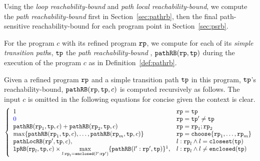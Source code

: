 Using the \emph{loop reachability-bound} and \emph{path local reachability-bound}, we compute the \emph{path reachability-bound} first in Section~\ref{sec:pathrb}, 
then the final path-sensitive reachability-bound for each program point in Section~\ref{sec:psrb}.

For the program $c$ with its refined program $\mathtt{rp}$, we compute
for each of its \emph{simple transition path}s, $\mathtt{tp}$ the \emph{path reachability-bound} , $\mathtt{pathRB}(\mathtt{rp}, \mathtt{tp})$ during the execution of the program $c$ as in Definition~\ref{def:pathrb}.
%
\begin{defn}
  \label{def:pathrb}
  Given a refined program $\mathtt{rp}$ and a simple transition path $\mathtt{tp}$ in this program, 
  $\mathtt{tp}$'s reachability-bound, $\mathtt{pathRB}(\mathtt{rp}, \mathtt{tp}, c)$
  is computed recursively as follows. 
  The input $c$ is omitted in the following equations for concise given the context is clear.
\[
  \left\{ 
  \begin{array}{ll}
    1  & \rprog = \tpath\\
    \highlight{0} & \rprog = \tpath' \neq \tpath\\
    \inoutB(\rprog_1, \tpath, c) + \inoutB(\rprog_2, \tpath, c) & \rprog = \rprog_1;\rprog_2 \\
    \max\left\{ \inoutB(\rprog_1, \tpath, c), \ldots, \inoutB(\rprog_m, \tpath, c) \right\} 
    & \rprog = \rpchoose{\rprog_1, \ldots, \rprog_m } \\
    \outinB(\rprog', \tpath, c), & l: \rprog_l \land l = \kw{closest}(\tpath) \\
    \lpchB(\rprog_l, \tpath , c)
    \times \max\limits_{l:\rprog_l = \kw{enclosed}(l':\rprog')}
   \{\inoutB(l':\rprog', \tpath)\} \footnotemark, & l: \rprog_l \land l \neq \kw{enclosed}(\tpath) \\
  \end{array}
  \right.
  \]
  \end{defn}
%

